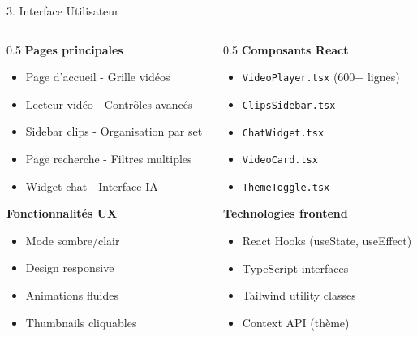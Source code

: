 \documentclass[11pt]{beamer}
\begin{document}
\begin{frame}{3. Interface Utilisateur}
\begin{columns}
\begin{column}{0.5\textwidth}
\textbf{Pages principales}
\begin{itemize}
    \item[$\checkmark$] Page d'accueil - Grille vidéos
    \item[$\checkmark$] Lecteur vidéo - Contrôles avancés
    \item[$\checkmark$] Sidebar clips - Organisation par set
    \item[$\checkmark$] Page recherche - Filtres multiples
    \item[$\checkmark$] Widget chat - Interface IA
\end{itemize}

\vspace{0.3cm}

\textbf{Fonctionnalités UX}
\begin{itemize}
    \item Mode sombre/clair
    \item Design responsive
    \item Animations fluides
    \item Thumbnails cliquables
\end{itemize}
\end{column}

\begin{column}{0.5\textwidth}
\textbf{Composants React}
\begin{itemize}
    \item \texttt{VideoPlayer.tsx} (600+ lignes)
    \item \texttt{ClipsSidebar.tsx}
    \item \texttt{ChatWidget.tsx}
    \item \texttt{VideoCard.tsx}
    \item \texttt{ThemeToggle.tsx}
\end{itemize}

\vspace{0.3cm}

\textbf{Technologies frontend}
\begin{itemize}
    \item React Hooks (useState, useEffect)
    \item TypeScript interfaces
    \item Tailwind utility classes
    \item Context API (thème)
\end{itemize}
\end{column}
\end{columns}
\end{frame}
\end{document}
